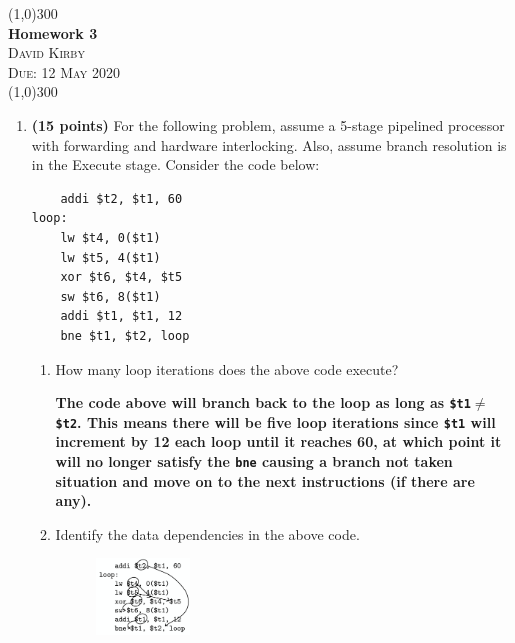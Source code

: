 \documentclass{article}
\title{}
\begin{document}
 	\begin{center}
     \line(1,0){300}\\[0.25cm]
 	\large{\bfseries Homework 3}\\
 	\textsc{\large David Kirby}\\
 	\textsc{\large Due: 12 May 2020}\\
 	\line(1,0){300}\\[0.75cm]
 	\end{center}

\begin{enumerate}
\item \textbf{(15 points)} For the following problem, assume a 5-stage pipelined processor with forwarding and hardware interlocking. Also, assume branch resolution is in the Execute stage. Consider the code below:\begin{verbatim}
    addi $t2, $t1, 60
loop:
    lw $t4, 0($t1)
    lw $t5, 4($t1)
    xor $t6, $t4, $t5
    sw $t6, 8($t1)
    addi $t1, $t1, 12
    bne $t1, $t2, loop
    \end{verbatim}\par
\begin{enumerate}
    \item How many loop iterations does the above code execute?\par
    \textbf{The code above will branch back to the loop as long as \texttt{\$t1}$\bm\ne$\texttt{\$t2}. This means there will be five loop iterations since \texttt{\$t1} will increment by 12 each loop until it reaches 60, at which point it will no longer satisfy the \texttt{bne} causing a branch not taken situation and move on to the next instructions (if there are any).}
    \item Identify the data dependencies in the above code.
        \begin{figure}[h!]
        \centering
        \includegraphics[width=0.25\textwidth]{Screen Shot 2020-05-06 at 16.05.44.png}
        \end{figure}

\end{enumerate}
\end{enumerate}
\end{document}
